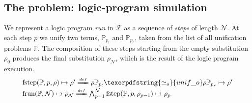 \documentclass[sigconf,natbib=false,review]{acmart}
\newcommand{\UnifRel}{\ensuremath{\simeq}}
\newcommand{\Uo}{\texorpdfstring{\ensuremath{\UnifRel_o}\xspace}{unif\_o}}
\newcommand{\Ue}{\ensuremath{\UnifRel_\lambda}\xspace}
\newcommand{\Fo}{\texorpdfstring{\ensuremath{\mathcal{F}\xspace}}{F}} %
\newcommand{\foUnifPb}{\ensuremath{\mathbb{P}}\xspace}
\begin{document}
\subsection{The problem: logic-program simulation}
We represent a logic program \emph{run} in \Fo{} as
a sequence of \emph{steps} of length $\mathcal{N}$.
At each step $p$ we unify two terms, $\foUnifPb_{p_l}$ and
$\foUnifPb_{p_r}$, taken from the list of all unification
problems \foUnifPb.
The composition of these steps starting from the
empty substitution $\rho_0$ produces the final
substitution $\rho_\mathcal{N}$, which is the result of the
logic program execution.
%
\newcommand{\C}[4]{\ensuremath{\langle #1 \rangle}\mapsto(#2,#3,#4)}
\newcommand{\D}[4]{\ensuremath{\langle #1,#2,#3 \rangle^{-1}\mapsto #4}}
\newcommand{\progress}{\ensuremath{\mathrm{progress}}\xspace}
\newcommand{\fstep}{\ensuremath{\mathrm{fstep}}\xspace}
\newcommand{\hstep}{\ensuremath{\mathrm{hstep}}\xspace}
\newcommand{\frun}{\ensuremath{\mathrm{frun}}\xspace}
\newcommand{\hrun}{\ensuremath{\mathrm{hrun}}\xspace}
\newcommand{\stepF}[4]{\ensuremath{\fstep(#1,#2,#3) \mapsto #4}}
\newcommand{\stepFD}[4]{%
\ensuremath{#3 #1_{#2_l} \Uo #3 #1_{#2_r} \mapsto #4}}
\newcommand{\stepH}[6]{\ensuremath{\hstep(#1,#2,#3,#4) \mapsto (#5, #6)}}
\newcommand{\stepHD}[6]{\ensuremath{%
#3 #1_{#2_l} \Ue #3 #1_{#2_r} \mapsto #4 \land \progress(#6,#4) \mapsto (#6',#5)}}
\newcommand{\runF}[3]{\ensuremath{\frun(#1,#2) \mapsto #3_{#2}}}
\newcommand{\runFD}[2]{\ensuremath{%
\bigwedge_{p = 1}^{#2} \stepF{#1}{p}{\rho_{p-1}}{\rho_{p}}}}
\newcommand{\runH}[3]{\ensuremath{\hrun(#1,#2) \mapsto #3_{#2}}}
\newcommand{\runHD}[3]{\ensuremath{%
\bigwedge_{p = 1}^{#2} \stepH{#1}{p}{\sigma_{p-1}}{#3_{p-1}}{\sigma_{p}}{#3_p}}}
\newcommand{\deff}{\ensuremath{\stackrel{{\scriptscriptstyle def}}{=\!=\!\!\!=}}}
%
$$
\begin{array}{l}
\stepF{\foUnifPb}{p}{\rho}{\rho'}
\deff
\stepFD{\foUnifPb}{p}{\rho}{\rho'}\vspace{2pt}\\
\runF{\foUnifPb}{\mathcal{N}}{\rho}
\deff
\runFD{\foUnifPb}{\mathcal{N}}
\end{array}
$$
\end{document}
